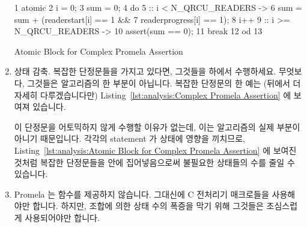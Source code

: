 \begin{enumerate}
\begin{listing}[tbp]
{ \scriptsize
\begin{verbbox}
  1 atomic {
  2   i = 0;
  3   sum = 0;
  4   do
  5   :: i < N_QRCU_READERS ->
  6     sum = sum + (readerstart[i] == 1 &&
  7       readerprogress[i] == 1);
  8     i++
  9   :: i >= N_QRCU_READERS ->
 10     assert(sum == 0);
 11     break
 12   od
 13 }
\end{verbbox}
}
\centering
\theverbbox
\caption{Atomic Block for Complex Promela Assertion}
\label{lst:analysis:Atomic Block for Complex Promela Assertion}
\end{listing}

\item	상태 감축.
	복잡한 단정문들을 가지고 있다면, 그것들을  하에서
	수행하세요.
	무엇보다, 그것들은 알고리즘의 한 부분이 아닙니다.
	복잡한 단정문의 한 예는 (뒤에서 더 자세히 다루겠습니다만)
	Listing~\ref{lst:analysis:Complex Promela Assertion} 에 보여져 있습니다.

	이 단정문을 어토믹하지 않게 수행할 이유가 없는데, 이는 알고리즘의 실제
	부분이 아니기 때문입니다.
	각각의 statement 가 상태에 영향을 끼치므로,
	Listing~\ref{lst:analysis:Atomic Block for Complex Promela Assertion}
	에 보여진 것처럼 복잡한 단정문들을  안에 집어넣음으로써
	불필요한 상태들의 수를 줄일 수 있습니다.

\item	Promela 는 함수를 제공하지 않습니다.
	그대신에 C 전처리기 매크로들을 사용해야만 합니다.
	하지만, 조합에 의한 상태 수의 폭증을 막기 위해 그것들은 조심스럽게
	사용되어야만 합니다.
\iffalse

\item	State reduction.  If you have complex assertions, evaluate
	them under \co{atomic}.  After all, they are not part of the
	algorithm.  One example of a complex assertion (to be discussed
	in more detail later) is as shown in
	Listing~\ref{lst:analysis:Complex Promela Assertion}.

	There is no reason to evaluate this assertion
	non-atomically, since it is not actually part of the algorithm.
	Because each statement contributes to state, we can reduce
	the number of useless states by enclosing it in an \co{atomic}
	block as shown in
	Listing~\ref{lst:analysis:Atomic Block for Complex Promela Assertion}.

\item	Promela does not provide functions.
	You must instead use C preprocessor macros.
	However, you must use them carefully in order to avoid
	combinatorial explosion.
\fi
\end{enumerate}

